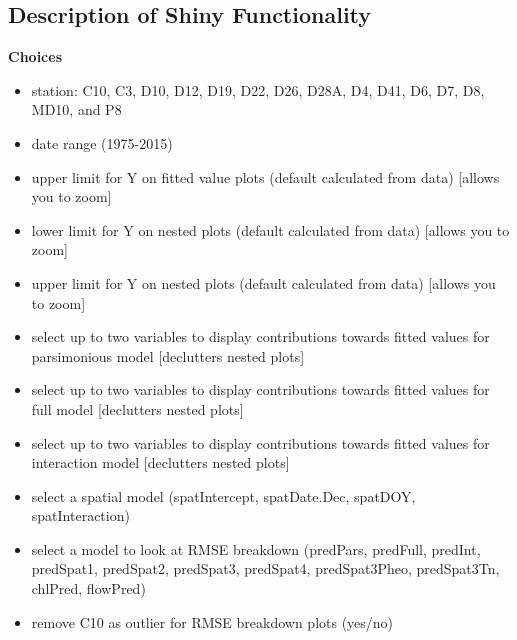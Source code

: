 \documentclass[12pt]{amsart}
\begin{document}
\subsection{Description of Shiny Functionality}

\textbf{Choices}
\begin{itemize}
\item station: C10, C3, D10, D12, D19, D22, D26, D28A, D4, D41, D6, D7, D8, MD10, and P8
\item date range (1975-2015)
\item upper limit for Y on fitted value plots (default calculated from data) [allows you to zoom]
\item lower limit for Y on nested plots (default calculated from data) [allows you to zoom]

\item upper limit for Y on nested plots (default calculated from data) [allows you to zoom]

\item select up to two variables to display contributions towards fitted values for parsimonious model [declutters nested plots]
\item select up to two variables to display contributions towards fitted values for full model [declutters nested plots]
\item select up to two variables to display contributions towards fitted values for interaction model [declutters nested plots]
\item select a spatial model (spatIntercept, spatDate.Dec, spatDOY, spatInteraction)
\item select a model to look at RMSE breakdown (predPars, predFull, predInt, predSpat1, predSpat2, predSpat3, predSpat4, predSpat3Pheo, predSpat3Tn, chlPred, flowPred)
\item remove C10 as outlier for RMSE breakdown plots (yes/no)
\end{itemize}
\end{document}
